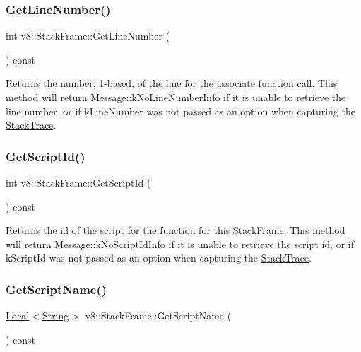 \subsubsection{\texorpdfstring{Get\+Line\+Number()}{GetLineNumber()}}
{\footnotesize\ttfamily int v8\+::\+Stack\+Frame\+::\+Get\+Line\+Number (\begin{DoxyParamCaption}{ }\end{DoxyParamCaption}) const}

Returns the number, 1-\/based, of the line for the associate function call. This method will return Message\+::k\+No\+Line\+Number\+Info if it is unable to retrieve the line number, or if k\+Line\+Number was not passed as an option when capturing the \mbox{\hyperlink{classv8_1_1StackTrace}{Stack\+Trace}}. \mbox{\label{classv8_1_1StackFrame_ac2f0f26b9c7aee860cdd613c0d83ae35}} 
\subsubsection{\texorpdfstring{Get\+Script\+Id()}{GetScriptId()}}
{\footnotesize\ttfamily int v8\+::\+Stack\+Frame\+::\+Get\+Script\+Id (\begin{DoxyParamCaption}{ }\end{DoxyParamCaption}) const}

Returns the id of the script for the function for this \mbox{\hyperlink{classv8_1_1StackFrame}{Stack\+Frame}}. This method will return Message\+::k\+No\+Script\+Id\+Info if it is unable to retrieve the script id, or if k\+Script\+Id was not passed as an option when capturing the \mbox{\hyperlink{classv8_1_1StackTrace}{Stack\+Trace}}. \mbox{\label{classv8_1_1StackFrame_a2885f14557e14c64396206b0f79daa3e}} 
\subsubsection{\texorpdfstring{Get\+Script\+Name()}{GetScriptName()}}
{\footnotesize\ttfamily \mbox{\hyperlink{classv8_1_1Local}{Local}}$<$\mbox{\hyperlink{classv8_1_1String}{String}}$>$ v8\+::\+Stack\+Frame\+::\+Get\+Script\+Name (\begin{DoxyParamCaption}{ }\end{DoxyParamCaption}) const}

